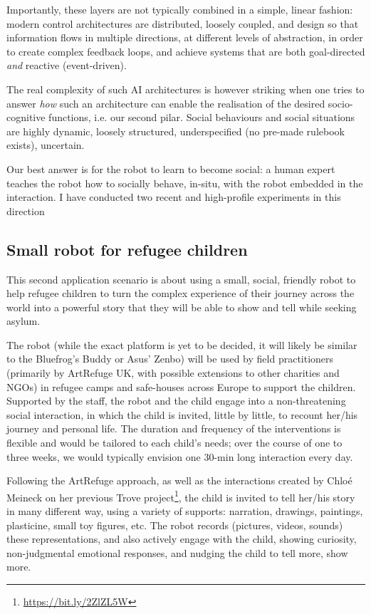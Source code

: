 \documentclass[11pt]{report}
\begin{document}
Importantly, these layers are not typically combined in a simple, linear
fashion: modern control architectures are distributed, loosely coupled, and
design so that information flows in multiple directions, at different levels of
abstraction, in order to create complex feedback loops, and achieve systems that are
both goal-directed \emph{and} reactive (event-driven).


The real complexity of such AI architectures is however striking when one tries
to answer \emph{how} such an architecture can enable the realisation of the
desired socio-cognitive functions, i.e. our second pilar. Social behaviours and
social situations are highly dynamic, loosely structured, underspecified (no
pre-made rulebook exists), uncertain.

Our best answer is for the robot to learn to become social: a human expert teaches
the robot how to socially behave, in-situ, with the robot embedded in the
interaction. I have conducted two recent and high-profile experiments in this
direction

\subsection{Small robot for refugee children}
This second application scenario is about using a small, social, friendly robot
to help refugee children to turn the complex experience of their journey across
the world into a powerful story that they will be able to show and tell while
seeking asylum.

The robot (while the exact platform is yet to be decided, it will likely be
similar to the Bluefrog's Buddy or Asus' Zenbo) will be used by field
practitioners (primarily by ArtRefuge UK, with possible extensions to other
charities and NGOs) in refugee camps and safe-houses across Europe to support
the children. Supported by the staff, the robot and the child engage into a
non-threatening social interaction, in which the child is invited, little by
little, to recount her/his journey and personal life. The duration and frequency
of the interventions is flexible and would be tailored to each child's needs;
over the course of one to three weeks, we would typically envision one 30-min
long interaction every day.

Following the ArtRefuge approach, as well as the interactions created by Chloé
Meineck on her previous Trove project\footnote{\url{https://bit.ly/2ZlZL5W}},
the child is invited to tell her/his story in many different way, using a
variety of supports: narration, drawings, paintings, plasticine, small toy
figures, etc.  The robot records (pictures, videos, sounds) these
representations, and also actively engage with the child, showing curiosity,
non-judgmental emotional responses, and nudging the child to tell more, show
more.
\end{document}
